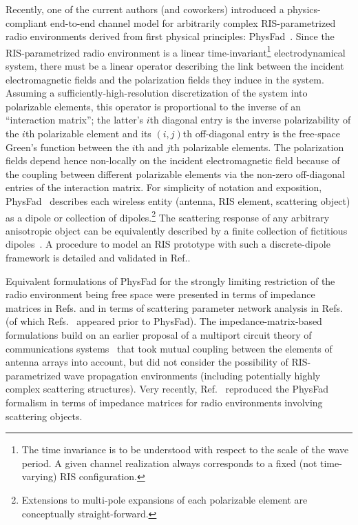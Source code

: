 \documentclass[journal,12pt,onecolumn,draftclsnofoot]{IEEEtran}
\begin{document}
Recently, one of the current authors (and coworkers) introduced a physics-compliant end-to-end channel model for arbitrarily complex RIS-parametrized radio environments derived from first physical principles: PhysFad~\cite{PhysFad}. 
Since the RIS-parametrized radio environment is a linear time-invariant\footnote{The time invariance is to be understood with respect to the scale of the wave period. A given channel realization always corresponds to a fixed (not time-varying) RIS configuration.} electrodynamical system, there must be a linear operator describing the link between the incident electromagnetic fields and the polarization fields they induce in the system. Assuming a sufficiently-high-resolution discretization of the system into polarizable elements, this operator is proportional to the inverse of an ``interaction matrix''; the latter's $i$th diagonal entry is the inverse polarizability of the $i$th polarizable element and its $(i,j)$th off-diagonal entry is the free-space Green's function between the $i$th and $j$th polarizable elements. The polarization fields depend hence non-locally on the incident electromagnetic field because of the coupling between different polarizable elements via the non-zero off-diagonal entries of the interaction matrix. 
For simplicity of notation and exposition, PhysFad~\cite{PhysFad} describes each wireless entity (antenna, RIS element, scattering object) as a dipole or collection of dipoles.\footnote{Extensions to multi-pole expansions of each polarizable element are conceptually straight-forward.} The scattering response of any arbitrary anisotropic object can be equivalently described by a finite collection of fictitious dipoles~\cite{bertrand2020global}. A procedure to model an RIS prototype with such a discrete-dipole framework is detailed and validated in Ref.\cite{diebold2023reflectarray}.

Equivalent formulations of PhysFad for the strongly limiting restriction of the radio environment being free space were presented in terms of impedance matrices in Refs.\cite{williams2020communication,gradoni_EndtoEnd_2020,badheka2023accurate,akrout2023physically} and in terms of scattering parameter network analysis in Refs.~\cite{shen2021modeling,franek2023electromagnetics} (of which Refs.~\cite{williams2020communication,gradoni_EndtoEnd_2020,shen2021modeling} appeared prior to PhysFad). The impedance-matrix-based formulations build on an earlier proposal of a multiport circuit theory of communications systems~\cite{ivrlavc2010toward,ivrlavc2014multiport} that took mutual coupling between the elements of antenna arrays into account, but did not consider the possibility of RIS-parametrized wave propagation environments (including potentially highly complex scattering structures). Very recently, Ref.~\cite{mursia2023modeling} reproduced the PhysFad formalism in terms of impedance matrices for radio environments involving scattering objects.
\end{document}
